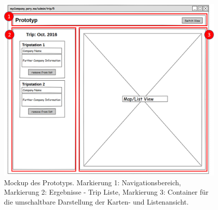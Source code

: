 \documentclass[Bachelorarbeit.tex]{subfiles}
\begin{document}
\begin{figure}[h]
\centering
\includegraphics[width=0.8\linewidth]{img/Mockups/prototypMockup}
\caption[Mockup des Prototyps]{Mockup des Prototyps. Markierung 1: Navigationsbereich, Markierung 2: Ergebnisse - Trip Liste, Markierung 3: Container für die umschaltbare Darstellung der Karten- und Listenansicht.}
\label{fig:prototypMockup}
\end{figure}
\end{document}

